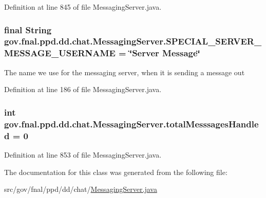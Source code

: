 Definition at line 845 of file Messaging\-Server.\-java.

\hypertarget{classgov_1_1fnal_1_1ppd_1_1dd_1_1chat_1_1MessagingServer_a738da0a18944421491268d2220a3c7a4}{
\subsubsection[{S\-P\-E\-C\-I\-A\-L\-\_\-\-S\-E\-R\-V\-E\-R\-\_\-\-M\-E\-S\-S\-A\-G\-E\-\_\-\-U\-S\-E\-R\-N\-A\-M\-E}]{\setlength{\rightskip}{0pt plus 5cm}final String gov.\-fnal.\-ppd.\-dd.\-chat.\-Messaging\-Server.\-S\-P\-E\-C\-I\-A\-L\-\_\-\-S\-E\-R\-V\-E\-R\-\_\-\-M\-E\-S\-S\-A\-G\-E\-\_\-\-U\-S\-E\-R\-N\-A\-M\-E = \char`\"{}Server Message\char`\"{}\hspace{0.3cm}{\ttfamily [static]}}}\label{classgov_1_1fnal_1_1ppd_1_1dd_1_1chat_1_1MessagingServer_a738da0a18944421491268d2220a3c7a4}
The name we use for the messaging server, when it is sending a message out 

Definition at line 186 of file Messaging\-Server.\-java.

\hypertarget{classgov_1_1fnal_1_1ppd_1_1dd_1_1chat_1_1MessagingServer_a6847562b2441991b550f7b3cb7fe8f2d}{
\subsubsection[{total\-Messsages\-Handled}]{\setlength{\rightskip}{0pt plus 5cm}int gov.\-fnal.\-ppd.\-dd.\-chat.\-Messaging\-Server.\-total\-Messsages\-Handled = 0\hspace{0.3cm}{\ttfamily [protected]}}}\label{classgov_1_1fnal_1_1ppd_1_1dd_1_1chat_1_1MessagingServer_a6847562b2441991b550f7b3cb7fe8f2d}


Definition at line 853 of file Messaging\-Server.\-java.



The documentation for this class was generated from the following file\-:\begin{DoxyCompactItemize}
\item 
src/gov/fnal/ppd/dd/chat/\hyperlink{MessagingServer_8java}{Messaging\-Server.\-java}\end{DoxyCompactItemize}

